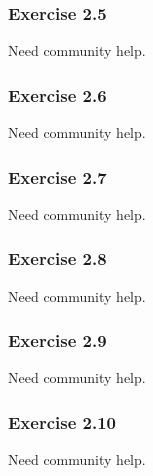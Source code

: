 \documentclass[../../main.tex]{subfiles}
\begin{document}
\subsubsection*{Exercise 2.5}

Need community help.

\subsubsection*{Exercise 2.6}

Need community help.

\subsubsection*{Exercise 2.7}

Need community help.

\subsubsection*{Exercise 2.8}

Need community help.

\subsubsection*{Exercise 2.9}

Need community help.

\subsubsection*{Exercise 2.10}

Need community help.
\end{document}

